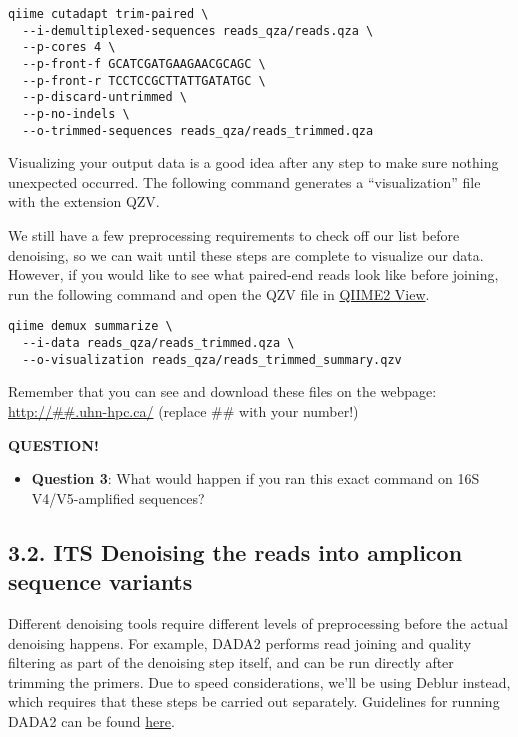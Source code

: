 \documentclass[
]{book}
\providecommand{\tightlist}{%
  \setlength{\itemsep}{0pt}\setlength{\parskip}{0pt}}
\newenvironment{bluebox}{
  \definecolor{shadecolor}{RGB}{172, 210, 237}
  \color{white}
  \begin{shaded}}
 {\end{shaded}}
\begin{document}
\begin{verbatim}
qiime cutadapt trim-paired \
  --i-demultiplexed-sequences reads_qza/reads.qza \
  --p-cores 4 \
  --p-front-f GCATCGATGAAGAACGCAGC \
  --p-front-r TCCTCCGCTTATTGATATGC \
  --p-discard-untrimmed \
  --p-no-indels \
  --o-trimmed-sequences reads_qza/reads_trimmed.qza
\end{verbatim}

Visualizing your output data is a good idea after any step to make sure nothing unexpected occurred. The following command generates a ``visualization'' file with the extension QZV.

We still have a few preprocessing requirements to check off our list before denoising, so we can wait until these steps are complete to visualize our data. However, if you would like to see what paired-end reads look like before joining, run the following command and open the QZV file in \href{https://view.qiime2.org/}{QIIME2 View}.

\begin{verbatim}
qiime demux summarize \
  --i-data reads_qza/reads_trimmed.qza \
  --o-visualization reads_qza/reads_trimmed_summary.qzv
\end{verbatim}

Remember that you can see and download these files on the webpage: \url{http://\#\#.uhn-hpc.ca/} (replace \#\# with your number!)

\begin{bluebox}

\begin{center}
\textbf{QUESTION!}

\end{center}

\begin{itemize}
\tightlist
\item
  \textbf{Question 3}: What would happen if you ran this exact command on 16S V4/V5-amplified sequences?
\end{itemize}

\end{bluebox}

\subsection{3.2. ITS Denoising the reads into amplicon sequence variants}\label{its-denoising-the-reads-into-amplicon-sequence-variants}

Different denoising tools require different levels of preprocessing before the actual denoising happens. For example, DADA2 performs read joining and quality filtering as part of the denoising step itself, and can be run directly after trimming the primers. Due to speed considerations, we'll be using Deblur instead, which requires that these steps be carried out separately. Guidelines for running DADA2 can be found \href{https://github.com/LangilleLab/microbiome_helper/wiki/QIIME2-DADA2-Quick-Reference}{here}.
\end{document}
